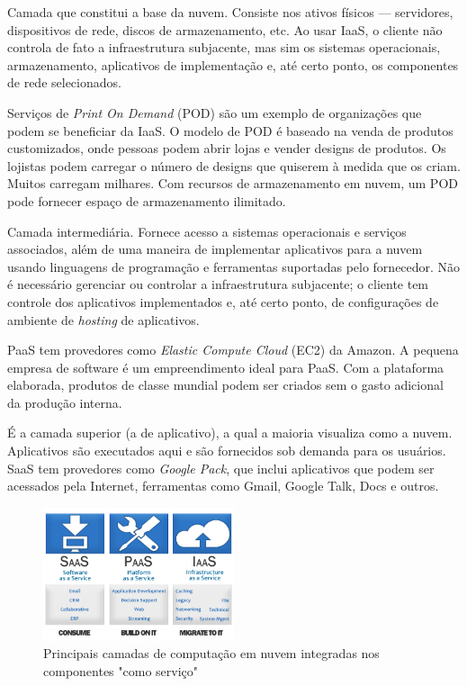\begin{itemise}

     Camada que constitui a base da 
    nuvem. Consiste nos ativos físicos --- servidores, dispositivos de rede, discos 
    de armazenamento, etc. Ao usar IaaS, o cliente não controla de fato a 
    infraestrutura subjacente, mas sim os sistemas operacionais, armazenamento, 
    aplicativos de implementação e, até certo ponto, os componentes de rede 
    selecionados. 

    Serviços de \emph{Print On Demand} (POD) são um exemplo de organizações que 
    podem se beneficiar da IaaS. O modelo de POD é baseado na venda de produtos 
    customizados, onde pessoas podem abrir lojas e vender designs de produtos. Os 
    lojistas podem carregar o número de designs que quiserem à medida que os criam. 
    Muitos carregam milhares. Com recursos de armazenamento em nuvem, um POD pode 
    fornecer espaço de armazenamento ilimitado.

     Camada intermediária. Fornece acesso a 
    sistemas operacionais e serviços associados, além de uma maneira de implementar 
    aplicativos para a nuvem usando linguagens de programação e ferramentas 
    suportadas pelo fornecedor. Não é necessário gerenciar ou controlar a 
    infraestrutura subjacente; o cliente tem controle dos aplicativos implementados 
    e, até certo ponto, de configurações de ambiente de \emph{hosting} de 
    aplicativos. 

    PaaS tem provedores como \emph{Elastic Compute Cloud} (EC2) da Amazon. A pequena 
empresa de software é um empreendimento ideal para PaaS. Com a plataforma elaborada,
produtos de classe mundial podem ser criados sem o gasto adicional da produção
interna.

     É a camada superior (a de aplicativo), a 
    qual a maioria visualiza como a nuvem. Aplicativos são executados aqui e são 
    fornecidos sob demanda para os usuários. SaaS tem provedores como \emph{Google 
    Pack}, que inclui aplicativos que podem ser acessados pela Internet, ferramentas 
    como Gmail, Google Talk, Docs e outros.

\end{itemise}

\begin{figure}[H]
    \centering
    \includegraphics[width=0.5\textwidth]{img/services2.png}
    \caption{Principais camadas de computação em nuvem integradas nos componentes
        "como serviço"~\cite{code-trick-getting-started-cloud}}
    \label{fig:layers}
\end{figure}


